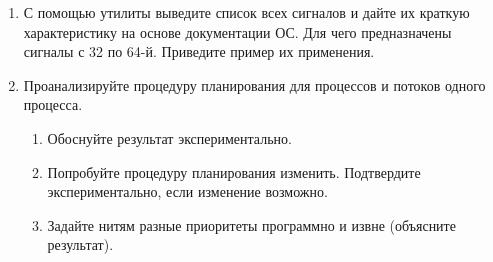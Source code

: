 \begin{enumerate}
	\item С помощью утилиты  выведите список всех сигналов и дайте их краткую характеристику на основе документации ОС. Для чего предназначены сигналы с 32 по 64-й. Приведите пример их применения.
	\item Проанализируйте процедуру планирования для процессов и потоков одного процесса. 
		\begin{enumerate}
			\item Обоснуйте результат экспериментально.
			\item Попробуйте процедуру планирования изменить. Подтвердите экспериментально, если изменение возможно.
			\item Задайте нитям разные приоритеты программно и извне (объясните результат). 
		\end{enumerate}
\end{enumerate}
